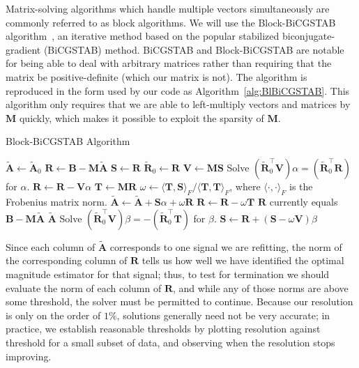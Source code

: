 Matrix-solving algorithms which handle multiple vectors simultaneously are commonly referred to as block algorithms.  We will use the Block-BiCGSTAB algorithm~\cite{BlBiCGSTAB}, an iterative method based on the popular stabilized biconjugate-gradient (BiCGSTAB) method.  BiCGSTAB and Block-BiCGSTAB are notable for being able to deal with arbitrary matrices rather than requiring that the matrix be positive-definite (which our matrix is not).  The algorithm is reproduced in the form used by our code as Algorithm~\ref{alg:BlBiCGSTAB}.  This algorithm only requires that we are able to left-multiply vectors and matrices by $\mathbf{M}$ quickly, which makes it possible to exploit the sparsity of $\mathbf{M}$.

\begin{algorithm}
\caption{Block-BiCGSTAB Algorithm}
\label{alg:BlBiCGSTAB}
\begin{algorithmic}[1]
\STATE $\mathbf{\widetilde{A}} \gets \mathbf{\widetilde{A}}_0$
\STATE $\mathbf{R} \gets \mathbf{B}-\mathbf{M\widetilde{A}}$ \label{algline:MatrixMul1}
\STATE $\mathbf{S} \gets \mathbf{R}$
\STATE $\mathbf{\widetilde{R}}_0 \gets \mathbf{R}$
\LOOP
  \STATE $\mathbf{V} \gets \mathbf{M}\mathbf{S}$ \label{algline:MatrixMul2}
  \STATE Solve $(\mathbf{\widetilde{R}}_0^\top \mathbf{V})\alpha = (\mathbf{\widetilde{R}}_0^\top \mathbf{R})$ for $\alpha$. \label{algline:BlBiCGSTAB_alpha}
  \STATE $\mathbf{R} \gets \mathbf{R} - \mathbf{V}\alpha$
  \STATE $\mathbf{T} \gets \mathbf{M}\mathbf{R}$ \label{algline:MatrixMul3}
  \STATE $\omega \gets {\langle \mathbf{T},\mathbf{S}\rangle_F} / {\langle \mathbf{T},\mathbf{T}\rangle_F} $, where $\langle\cdot,\cdot\rangle_F$ is the Frobenius matrix norm.
  \STATE $\mathbf{\widetilde{A}} \gets \mathbf{\widetilde{A}} + \mathbf{S}\alpha + \omega \mathbf{R}$
  \STATE $\mathbf{R} \gets \mathbf{R} - \omega \mathbf{T}$
  \STATE $\mathbf{R}$ currently equals $\mathbf{B}-\mathbf{M\widetilde{A}}$
    \RETURN $\mathbf{\widetilde{A}}$
  \ENDIF
  \STATE Solve $(\mathbf{\widetilde{R}}_0^\top \mathbf{V})\beta = -(\mathbf{\widetilde{R}}_0^\top \mathbf{T})$ for $\beta$. \label{algline:BlBiCGSTAB_beta}
  \STATE $\mathbf{S} \gets \mathbf{R} + (\mathbf{S} - \omega \mathbf{V}) \beta$
\ENDLOOP
\end{algorithmic}
\end{algorithm}

Since each column of $\mathbf{\widetilde{A}}$ corresponds to one signal we are refitting, the norm of the corresponding column of $\mathbf{R}$ tells us how well we have identified the optimal magnitude estimator for that signal; thus, to test for termination we should evaluate the norm of each column of $\mathbf{R}$, and while any of those norms are above some threshold, the solver must be permitted to continue.  Because our resolution is only on the order of $1\%$, solutions generally need not be very accurate; in practice, we establish reasonable thresholds by plotting resolution against threshold for a small subset of data, and observing when the resolution stops improving.

